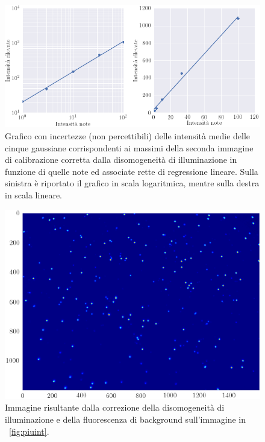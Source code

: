 \begin{figure}
 \centering
 \includegraphics[scale=.55]{img/CAP3linearita.png}
 \caption{\small{Grafico con incertezze (non percettibili) delle intensità medie delle cinque gaussiane corrispondenti ai massimi della seconda immagine di calibrazione corretta dalla disomogeneità di illuminazione in funzione di quelle note ed associate rette di regressione lineare. Sulla sinistra è riportato il grafico in scala logaritmica, mentre sulla destra in scala lineare.}}
 \label{fig:linearita}
\end{figure}


\begin{figure}[p]
 \centering
 \includegraphics[scale=.64]{img/CAP3piuintcorr.png}
 \caption{\small{Immagine risultante dalla correzione della disomogeneità di illuminazione e della fluorescenza di background sull'immagine in \figurename~\ref{fig:piuint}.}}
 \label{fig:piuintcorr}
\end{figure}

